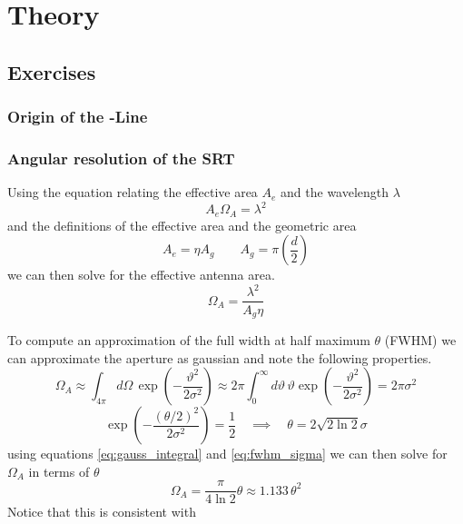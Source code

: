 \section{Theory}
\subsection{Exercises}
\subsubsection[Origin of the HI-Line]{Origin of the -Line}

\subsubsection{Angular resolution of the SRT}\label{sec:ang_res}
Using the equation relating the effective area $A_e$ and the wavelength $\lambda$ \cite[p. 149]{wilson}
\begin{equation}
    A_e \Omega_A = \lambda^2
\end{equation}
and the definitions of the effective area and the geometric area \cite[p. 148]{wilson}
\begin{equation}
    A_e = \eta A_g \qquad A_g = \pi \left( \frac{d}{2} \right) \label{eq:A_e}
\end{equation}
we can then solve for the effective antenna area.
\begin{equation}
    \Omega_A = \frac{\lambda^2}{A_g \eta} \label{eq:Omega_A}
\end{equation}


To compute an approximation of the full width at half maximum $\theta$ (FWHM) we can approximate the aperture as gaussian \cite[p. 2]{srt} and note the following properties.
\begin{equation}
    \Omega_A \approx \int_{4\pi } d\Omega\, \exp{\left( -\frac{\vartheta^2}{2\sigma^2} \right)} \approx 2\pi \int_0^{\infty} d\vartheta \, \vartheta \exp{\left( -\frac{\vartheta^2}{2\sigma^2} \right)} = 2\pi \sigma^2
    \label{eq:gauss_integral}
\end{equation}
\begin{equation}
    \exp{\left( -\frac{(\theta/2)^2}{2\sigma^2}\right)} = \frac{1}{2} \quad \implies \quad \theta = 2 \sqrt{2\ln{2}} \sigma \label{eq:fwhm_sigma}
\end{equation}
using equations \eqref{eq:gauss_integral} and \eqref{eq:fwhm_sigma} we can then solve for $\Omega_A$ in terms of $\theta$
\begin{equation}
    \Omega_A = \frac{\pi}{4\ln{2}} \theta \approx 1.133 \, \theta^2 \label{eq:Omega_A_fwhhm}
\end{equation}
Notice that this is consistent with \cite[p.178 (8.13)]{wilson}

